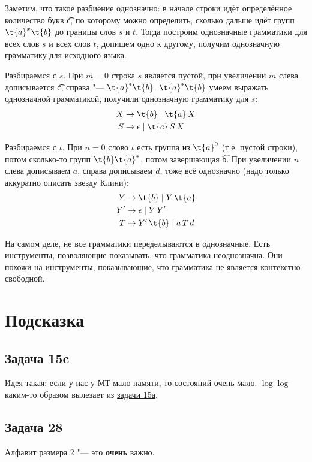 	Заметим, что такое разбиение однозначно: в начале строки идёт определённое количество букв \t{c},
	по которому можно определить, сколько дальше идёт групп $\t{a}^x\t{b}$ до границы слов $s$ и $t$.
	Тогда построим однозначные грамматики для всех слов $s$ и всех слов $t$, допишем одно к другому,
	получим однозначную грамматику для исходного языка.

	Разбираемся с $s$.
	При $m=0$ строка $s$ является пустой, при увеличении $m$ слева дописывается \t{c}, справа "--- $\t{a}^*\t{b}$.
	$\t{a}^*\t{b}$ умеем выражать однозначной грамматикой, получили однозначную грамматику для $s$:
	\begin{align*}
		X &\to \t{b} \mid \t{a}\,X \\
		S &\to \epsilon \mid \t{c}\,S\,X
	\end{align*}

	Разбираемся с $t$.
	При $n=0$ слово $t$ есть группа из $\t{a}^0$ (т.е. пустой строки), потом сколько-то групп $\t{b}\t{a}^*$, потом завершающая \t{b}.
	При увеличении $n$ слева дописываем $a$, справа дописываем $d$, тоже всё однозначно (надо только аккуратно описать
	звезду Клини):
	\begin{align*}
		Y &\to \t{b} \mid Y\,\t{a} \\
		Y' &\to \epsilon \mid Y\,Y' \\
		T &\to Y'\,\t{b} \mid a\,T\,d
	\end{align*}

	\begin{Rem}
		На самом деле, не все грамматики переделываются в однозначные.
		Есть инструменты, позволяющие показывать, что грамматика неоднозначна.
		Они похожи на инструменты, показывающие, что грамматика не является контекстно-свободной.
	\end{Rem}

\section{Подсказка}
\subsection{Задача 15c}
	Идея такая: если у нас у МТ мало памяти, то состояний очень мало.
	$\log \log$ каким-то образом вылезает из \hyperref[prob15a]{задачи 15а}.
	\TODO

\subsection{Задача 28}
	Алфавит размера 2 "--- это \textbf{очень} важно.
